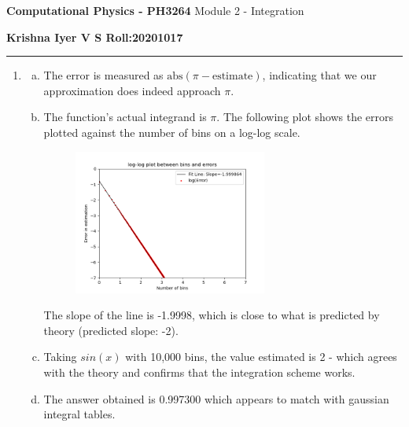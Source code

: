 \documentclass[11 pt]{article}
\begin{document}
\begin{center}
       \large{
       \textbf{Computational Physics - PH3264} \break
	Module 2 - Integration
}
\end{center}

\textbf{Krishna Iyer V S \hfill Roll:20201017}
\hrule 
\vspace{0.3cm}
\begin{enumerate}
\item
\begin{enumerate}[a.]

\item  The error is measured as $\text{abs}(\pi - \text{estimate})$, indicating that we our approximation does indeed approach $\pi$.

\item The function's actual integrand is $\pi$. The following plot shows the errors plotted against the number of bins on a log-log scale.
\begin{figure}[h]
\begin{center}
\includegraphics[width=2.5in]{"plots/log_log_q1_a.png"}
\end{center}
\end{figure}
		The slope of the line is -1.9998, which is close to what is predicted by theory (predicted slope: -2).

\item Taking $sin(x)$ with 10,000 bins, the value estimated is 2 - which agrees with the theory and confirms that the integration scheme works. 

\item The answer obtained is 0.997300 which appears to match with gaussian integral tables.
\end{enumerate}


\end{enumerate}
\end{document}
